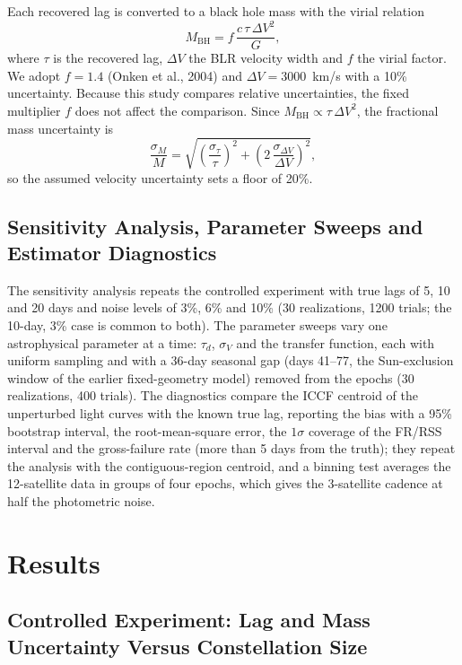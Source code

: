 \documentclass[11pt]{article}
\begin{document}
Each recovered lag is converted to a black hole mass with the virial relation
\begin{equation}
M_{\mathrm{BH}} = f \, \frac{c \, \tau \, \Delta V^2}{G},
\label{eq:virial}
\end{equation}
where $\tau$ is the recovered lag, $\Delta V$ the BLR velocity width and $f$ the virial factor. We adopt $f = 1.4$ (Onken et al., 2004) and $\Delta V = 3000$~km/s with a 10\% uncertainty. Because this study compares relative uncertainties, the fixed multiplier $f$ does not affect the comparison. Since $M_{\mathrm{BH}} \propto \tau\,\Delta V^2$, the fractional mass uncertainty is
\begin{equation}
\frac{\sigma_M}{M} = \sqrt{\left(\frac{\sigma_\tau}{\tau}\right)^2 + \left(2\,\frac{\sigma_{\Delta V}}{\Delta V}\right)^2},
\end{equation}
so the assumed velocity uncertainty sets a floor of 20\%.

\subsection{Sensitivity Analysis, Parameter Sweeps and Estimator Diagnostics}

The sensitivity analysis repeats the controlled experiment with true lags of 5, 10 and 20 days and noise levels of 3\%, 6\% and 10\% (30 realizations, 1200 trials; the 10-day, 3\% case is common to both). The parameter sweeps vary one astrophysical parameter at a time: $\tau_d$, $\sigma_V$ and the transfer function, each with uniform sampling and with a 36-day seasonal gap (days 41--77, the Sun-exclusion window of the earlier fixed-geometry model) removed from the epochs (30 realizations, 400 trials). The diagnostics compare the ICCF centroid of the unperturbed light curves with the known true lag, reporting the bias with a 95\% bootstrap interval, the root-mean-square error, the $1\sigma$ coverage of the FR/RSS interval and the gross-failure rate (more than 5 days from the truth); they repeat the analysis with the contiguous-region centroid, and a binning test averages the 12-satellite data in groups of four epochs, which gives the 3-satellite cadence at half the photometric noise.

\section{Results}

\subsection{Controlled Experiment: Lag and Mass Uncertainty Versus Constellation Size}
\end{document}
